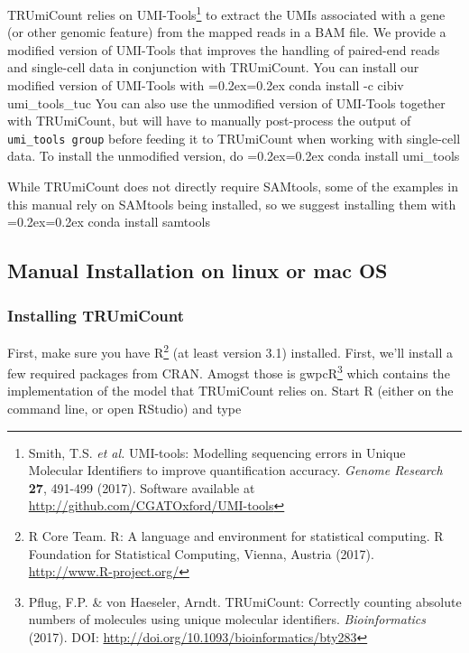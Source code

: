 \documentclass[a4paper]{scrartcl}
\makeatletter
\let\subsection@phlo\subsection
\renewcommand\subsection{\needspace{5\baselineskip}\subsection@phlo}
\newenvironment{shellcode}%
   {\bgroup\topsep=0.2ex\partopsep=0.2ex\shaded\verbatim}%
   {\endverbatim\endshaded\egroup}
\makeatother
\begin{document}
TRUmiCount relies on UMI-Tools\footnote{Smith, T.S. \textit{et al.} UMI-tools: Modelling sequencing errors in Unique Molecular Identifiers to improve quantification accuracy. \textit{Genome Research} \textbf{27}, 491-499 (2017). Software available at \url{http://github.com/CGATOxford/UMI-tools}} to extract the UMIs associated with a gene (or other genomic feature) from the mapped reads in a BAM file. We provide a modified version of UMI-Tools that improves the handling of paired-end reads and single-cell data in conjunction with TRUmiCount. You can install our modified version of UMI-Tools with
\begin{shellcode}
conda install -c cibiv umi_tools_tuc
\end{shellcode}
You can also use the unmodified version of UMI-Tools together with TRUmiCount, but will have to manually post-process the output of \texttt{umi\_tools group} before feeding it to TRUmiCount when working with single-cell data. To install the unmodified version, do
\begin{shellcode}
conda install umi_tools
\end{shellcode}

While TRUmiCount does not directly require SAMtools, some of the examples in this manual rely on SAMtools being installed, so we suggest installing them with
\begin{shellcode}
conda install samtools
\end{shellcode}


\subsection{Manual Installation on linux or mac OS}

\subsubsection*{Installing TRUmiCount}

First, make sure you have R\footnote{R Core Team. R: A language and environment for statistical
  computing. R Foundation for Statistical Computing, Vienna, Austria (2017). \url{http://www.R-project.org/}} (at least version 3.1) installed. First, we'll install a few required packages from CRAN. Amogst those is gwpcR\footnote{Pflug, F.P. \& von Haeseler, Arndt. TRUmiCount: Correctly counting absolute numbers of molecules using unique molecular identifiers. \textit{Bioinformatics} (2017). DOI:  \url{http://doi.org/10.1093/bioinformatics/bty283}} which contains the implementation of the model that TRUmiCount relies on. Start R (either on the command line, or open RStudio) and type
\end{document}
